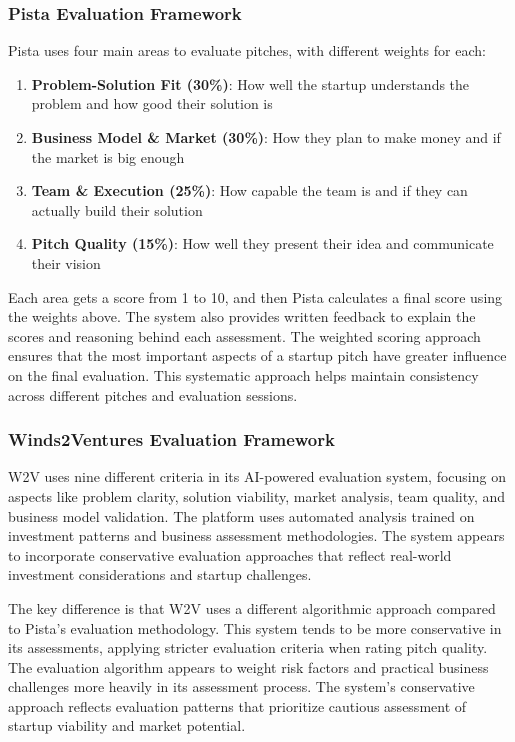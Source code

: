 \subsubsection{Pista Evaluation Framework}

Pista uses four main areas to evaluate pitches, with different weights for each:

\begin{enumerate}
    \item \textbf{Problem-Solution Fit (30\%)}: How well the startup understands the problem and how good their solution is
    \item \textbf{Business Model \& Market (30\%)}: How they plan to make money and if the market is big enough
    \item \textbf{Team \& Execution (25\%)}: How capable the team is and if they can actually build their solution
    \item \textbf{Pitch Quality (15\%)}: How well they present their idea and communicate their vision
\end{enumerate}

Each area gets a score from 1 to 10, and then Pista calculates a final score using the weights above. The system also provides written feedback to explain the scores and reasoning behind each assessment. The weighted scoring approach ensures that the most important aspects of a startup pitch have greater influence on the final evaluation. This systematic approach helps maintain consistency across different pitches and evaluation sessions.

\subsubsection{Winds2Ventures Evaluation Framework}

W2V uses nine different criteria in its AI-powered evaluation system, focusing on aspects like problem clarity, solution viability, market analysis, team quality, and business model validation. The platform uses automated analysis trained on investment patterns and business assessment methodologies. The system appears to incorporate conservative evaluation approaches that reflect real-world investment considerations and startup challenges.

The key difference is that W2V uses a different algorithmic approach compared to Pista's evaluation methodology. This system tends to be more conservative in its assessments, applying stricter evaluation criteria when rating pitch quality. The evaluation algorithm appears to weight risk factors and practical business challenges more heavily in its assessment process. The system's conservative approach reflects evaluation patterns that prioritize cautious assessment of startup viability and market potential.

